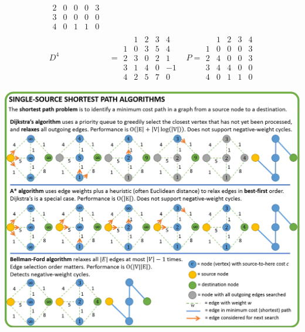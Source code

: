 \documentclass{article}
\begin{document}
\begin{multicols*}{2}
\begin{align*}
\begin{array}{c|cccc}
                      2 & 0 & 0 & 0 & 3 \\
                      3 & 0 & 0 & 0 & 0 \\
                      4 & 0 & 1 & 1 & 0
                  \end{array}                \\
        D^4 & = \begin{array}{c|cccc}
                      & 1 & 2 & 3 & 4  \\
                    \hline
                    1 & 0 & 3 & 5 & 4  \\
                    2 & 3 & 0 & 2 & 1  \\
                    3 & 1 & 4 & 0 & -1 \\
                    4 & 2 & 5 & 7 & 0
                \end{array}
            & P = \begin{array}{c|cccc}
                        & 1 & 2 & 3 & 4 \\
                      \hline
                      1 & 0 & 0 & 0 & 3 \\
                      2 & 4 & 0 & 0 & 3 \\
                      3 & 4 & 4 & 0 & 0 \\
                      4 & 0 & 1 & 1 & 0
                  \end{array}
    \end{align*}


    \includegraphics[width=\linewidth]{paths.png}

\end{multicols*}
\end{document}
